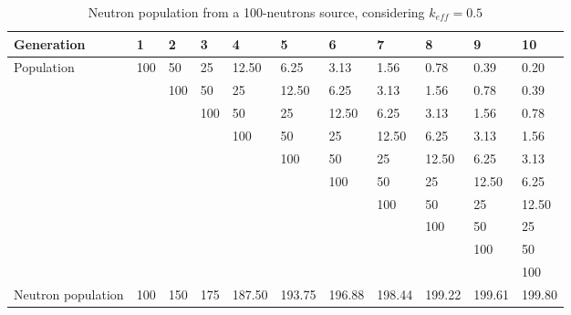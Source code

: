 \begin{table}[!htb]
\small
    \centering
\begin{tabular}{lllllllllll}
Generation         & 1   & 2   & 3   & 4   & 5   & 6   & 7   & 8   & 9   & 10  \\ \hline\hline
\multirow{10}{*}{Population}         & 100 & 50  & 25  & 12.50  & 6.25   & 3.13   & 1.56   & 0.78   & 0.39   & 0.20   \\
                   &        & 100 & 50  & 25  & 12.50  & 6.25   & 3.13   & 1.56   & 0.78   & 0.39   \\
                   &        &        & 100 & 50  & 25  & 12.50  & 6.25   & 3.13   & 1.56   & 0.78   \\
                   &        &        &        & 100 & 50  & 25  & 12.50  & 6.25   & 3.13   & 1.56   \\
                   &        &        &        &        & 100 & 50  & 25  & 12.50  & 6.25   & 3.13   \\
                   &        &        &        &        &        & 100 & 50  & 25  & 12.50  & 6.25   \\
                   &        &        &        &        &        &        & 100 & 50  & 25  & 12.50  \\
                   &        &        &        &        &        &        &        & 100 & 50  & 25  \\
                   &        &        &        &        &        &        &        &        & 100 & 50  \\
                   &        &        &        &        &        &        &        &        &        & 100 \\ \hline
Neutron population & 100 & 150 & 175 & 187.50 & 193.75 & 196.88 & 198.44 & 199.22 & 199.61 & 199.80
\end{tabular}
        \caption{Neutron population from a 100-neutrons source, considering $k_{eff} = 0.5$}\label{tab:keff05}
\end{table}





\
